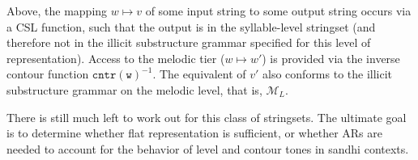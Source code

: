 \documentclass{article}
\begin{document}
\begin{exe}
\ex 
{}
\end{exe}
Above, the mapping $w \mapsto v$ of some input string to some output string occurs via a CSL function, such that the output is in the syllable-level stringset (and therefore not in the illicit substructure grammar specified for this level of representation). Access to the melodic tier ($w \mapsto w'$) is provided via the inverse contour function $\mathtt{cntr(w)}^{-1}$. The equivalent of $v'$ also conforms to the illicit substructure grammar on the melodic level, that is, $\mathcal{M}_{L}$. \par
There is still much left to work out for this class of stringsets. The ultimate goal is to determine whether flat representation is sufficient, or whether ARs are needed to account for the behavior of level and contour tones in sandhi contexts.
\end{document}
